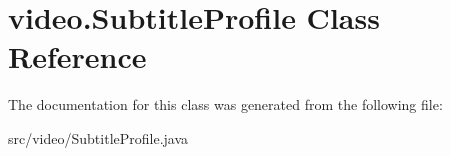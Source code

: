 \hypertarget{classvideo_1_1_subtitle_profile}{
\section{video.SubtitleProfile Class Reference}
\label{classvideo_1_1_subtitle_profile}
}


The documentation for this class was generated from the following file:\begin{DoxyCompactItemize}
\item 
src/video/SubtitleProfile.java\end{DoxyCompactItemize}
